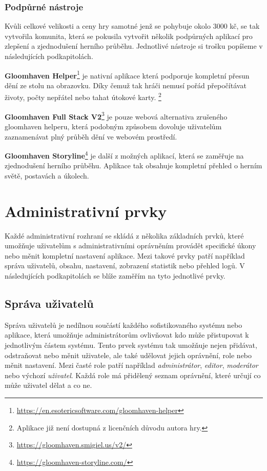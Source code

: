 \subsubsection*{Podpůrné nástroje}
\label{subsubsec:popular-board-games-analysis-gloomhaven-support-tools}
Kvůli celkové velikosti a ceny hry samotné jenž se pohybuje okolo 3000 kč, se tak vytvořila komunita, která se pokusila vytvořit několik podpůrných aplikací pro zlepšení a zjednodušení herního průběhu. Jednotlivé nástroje si trošku popíšeme v následujících podkapitolách.

\begin{description}
    \item \textbf{Gloomhaven Helper}\footnote{\href{https://en.esotericsoftware.com/gloomhaven-helper}{https://en.esotericsoftware.com/gloomhaven-helper}} je nativní aplikace která podporuje kompletní přesun dění ze stolu na obrazovku. Díky čemuž tak hráči nemusí pořád přepočítávat životy, počty nepřátel nebo tahat útokové karty. \footnote{Aplikace již není dostupná z licenčních důvodu autora hry.}
    \item \textbf{Gloomhaven Full Stack V2}\footnote{\href{https://gloomhaven.smigiel.us/v2/}{https://gloomhaven.smigiel.us/v2/}} je pouze webová alternativa zrušeného gloomhaven helperu, která podobným způsobem dovoluje uživatelům zaznamenávat plný průběh dění ve webovém prostředí.
    \item \textbf{Gloomhaven Storyline}\footnote{\href{https://gloomhaven-storyline.com/}{https://gloomhaven-storyline.com/}} je další z možných aplikací, která se zaměřuje na zjednodušení herního průběhu. Aplikace tak obsahuje kompletní přehled o herním světě, postavách a úkolech.
\end{description}

\section{Administrativní prvky}
\label{sec:admin-elements}
Každé administrativní rozhraní se skládá z několika základních prvků, které umožňuje uživatelům s administrativními oprávněním provádět specifické úkony nebo měnit kompletní nastavení aplikace. Mezi takové prvky patří například správa uživatelů, obsahu, nastavení, zobrazení statistik nebo přehled logů. V následujících podkapitolách se blíže zaměřím na tyto jednotlivé prvky.

\subsection{Správa uživatelů}
\label{subsec:admin-elements-user-management}
Správa uživatelů je nedílnou součástí každého sofistikovaného systému nebo aplikace, která umožňuje administrátorům ovlivňovat kdo může přistupovat k jednotlivým částem systému. Tento prvek systému tak umožňuje nejen přidávat, odstraňovat nebo měnit uživatele, ale také udělovat jejich oprávnění, role nebo měnit nastavení. Mezi časté role patří například \textit{administrátor}, \textit{editor}, \textit{moderátor} nebo výchozí \textit{uživatel}. Každá role má přidělený seznam oprávnění, které určují co může uživatel dělat a co ne.

